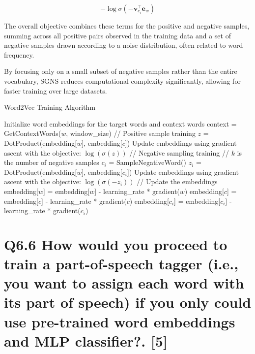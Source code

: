 \documentclass[11pt]{article}
\begin{document}
\begin{equation}
    -\log \sigma(-\mathbf{v}_{c_i}^\top \mathbf{e}_w)
\end{equation}

The overall objective combines these terms for the positive and negative samples, summing across all positive pairs observed in the training data and a set of negative samples drawn according to a noise distribution, often related to word frequency.

By focusing only on a small subset of negative samples rather than the entire vocabulary, SGNS reduces computational complexity significantly, allowing for faster training over large datasets.

\begin{algorithm}
\caption{Word2Vec Training Algorithm}
\begin{algorithmic}[1]
\State Initialize word embeddings for the target words and context words
        \State context = GetContextWords($w$, window\_size)
            \State // Positive sample training
            \State $z$ = DotProduct(embedding[$w$], embedding[$c$])
            \State Update embeddings using gradient ascent with the objective: $\log(\sigma(z))$
            \State // Negative sampling training
             // $k$ is the number of negative samples
                \State $c_i$ = SampleNegativeWord()
                \State $z_i$ = DotProduct(embedding[$w$], embedding[$c_i$])
                \State Update embeddings using gradient ascent with the objective: $\log(\sigma(-z_i))$
            \EndFor
            \State // Update the embeddings
            \State embedding[$w$] = embedding[$w$] - learning\_rate * gradient($w$)
            \State embedding[$c$] = embedding[$c$] - learning\_rate * gradient($c$)
                \State embedding[$c_i$] = embedding[$c_i$] - learning\_rate * gradient($c_i$)
            \EndFor
        \EndFor
    \EndFor
\EndFor
\end{algorithmic}
\end{algorithm}

\section{Q6.6 How would you proceed to train a part-of-speech tagger (i.e., you want to assign each word with its part of speech) if you only could use pre-trained word embeddings and MLP classifier?. [5]}
\end{document}
